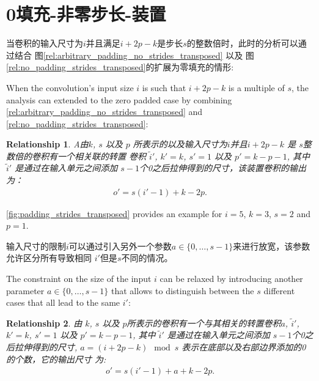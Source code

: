 \documentclass[notitlepage]{report}
\newtheorem{relationship}{Relationship}
\begin{document}
\section{0填充-非零步长-装置}

当卷积的输入尺寸为$i$并且满足$i + 2p - k$是步长$s$的整数倍时，此时的分析可以通过结合
图\autoref{rel:arbitrary_padding_no_strides_transposed} 以及
图\autoref{rel:no_padding_strides_transposed}的扩展为零填充的情形:

When the convolution's input size $i$ is such that $i + 2p - k$ is a multiple
of $s$, the analysis can extended to the zero padded case by combining
\autoref{rel:arbitrary_padding_no_strides_transposed} and
\autoref{rel:no_padding_strides_transposed}:


\begin{relationship}\label{rel:padding_strides_transposed}
A由$k$, $s$ 以及 $p$ 所表示的以及输入尺寸为$i$并且$i + 2p - k$ 是 $s$整数倍的卷积有一个相关联的转置
卷积 $\tilde{i}'$, $k' = k$, $s' = 1$ 以及
$p' = k - p - 1$, 其中 $\tilde{i}'$ 是通过在输入单元之间添加
$s - 1$个0之后拉伸得到的尺寸，该装置卷积的输出为：
\begin{equation*}
\begin{split}
    o' = s (i' - 1) + k - 2p.
\end{split}
\end{equation*}
\end{relationship}

\autoref{fig:padding_strides_transposed} provides an example for $i = 5$, $k =
3$, $s = 2$ and $p = 1$.

输入尺寸的限制$i$可以通过引入另外一个参数$a \in \{0, \ldots, s - 1\}$来进行放宽，该参数允许区分所有导致相同
$i'$但是$s$不同的情况。

The constraint on the size of the input $i$ can be relaxed by introducing
another parameter $a \in \{0, \ldots, s - 1\}$ that allows to distinguish
between the $s$ different cases that all lead to the same $i'$:



\begin{relationship}\label{rel:padding_strides_transposed_odd}
由 $k$, $s$ 以及 $p$所表示的卷积有一个与其相关的转置卷积$a$, $\tilde{i}'$, $k' = k$, $s'
= 1$ 以及 $p' = k - p - 1$, 其中 $\tilde{i}'$ 是通过在输入单元之间添加
$s - 1$个0之后拉伸得到的尺寸, $a = (i + 2p - k) \mod s$ 表示在底部以及右部边界添加的0的个数，它的输出尺寸
为:
\begin{equation*}
\begin{split}
    o' = s (i' - 1) + a + k - 2p.
\end{split}
\end{equation*}
\end{relationship}
\end{document}
